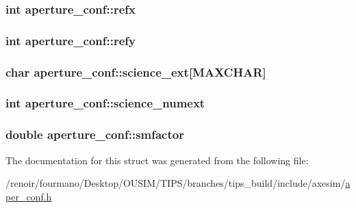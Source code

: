 \label{structaperture__conf_a13683d2e63f2e2ccb4f834dec5b2d0e3}
\hypertarget{structaperture__conf_a5cdddf8dafb95b7a77458fbdbf74e5b9}{
\subsubsection[{refx}]{\setlength{\rightskip}{0pt plus 5cm}int {\bf aperture\_\-conf::refx}}}
\label{structaperture__conf_a5cdddf8dafb95b7a77458fbdbf74e5b9}
\hypertarget{structaperture__conf_ae48467c471e66355a90db41d8ce77bc6}{
\subsubsection[{refy}]{\setlength{\rightskip}{0pt plus 5cm}int {\bf aperture\_\-conf::refy}}}
\label{structaperture__conf_ae48467c471e66355a90db41d8ce77bc6}
\hypertarget{structaperture__conf_adde45d5e583dd6566f7ce226a65a70df}{
\subsubsection[{science\_\-ext}]{\setlength{\rightskip}{0pt plus 5cm}char {\bf aperture\_\-conf::science\_\-ext}\mbox{[}MAXCHAR\mbox{]}}}
\label{structaperture__conf_adde45d5e583dd6566f7ce226a65a70df}
\hypertarget{structaperture__conf_abe36ba97113a8ccb1916acdbe5db113f}{
\subsubsection[{science\_\-numext}]{\setlength{\rightskip}{0pt plus 5cm}int {\bf aperture\_\-conf::science\_\-numext}}}
\label{structaperture__conf_abe36ba97113a8ccb1916acdbe5db113f}
\hypertarget{structaperture__conf_aca74009eb7d64af0ba7222e9dbb879c1}{
\subsubsection[{smfactor}]{\setlength{\rightskip}{0pt plus 5cm}double {\bf aperture\_\-conf::smfactor}}}
\label{structaperture__conf_aca74009eb7d64af0ba7222e9dbb879c1}


The documentation for this struct was generated from the following file:\begin{DoxyCompactItemize}
\item 
/renoir/fourmano/Desktop/OUSIM/TIPS/branches/tips\_\-build/include/axesim/\hyperlink{aper__conf_8h}{aper\_\-conf.h}\end{DoxyCompactItemize}
